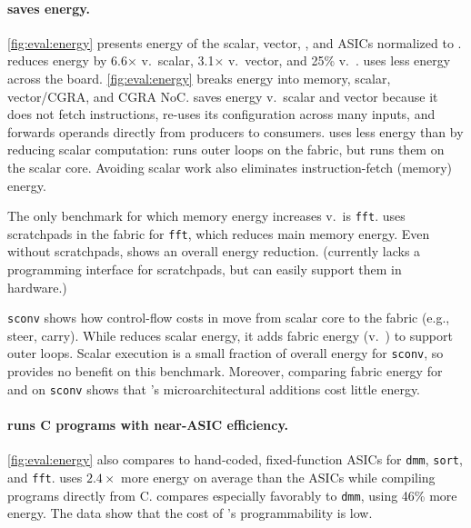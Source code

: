 \paragraph{\riptide saves energy.}
\autoref{fig:eval:energy} presents energy of the scalar, vector, 
\snafu, and ASICs normalized to \riptide.
% 
\riptide reduces energy by 6.6$\times$ v.\ scalar, 3.1$\times$ v.\ vector, and 25\% v.\ \snafu.
%
\riptide uses less energy across the board.
% 
\autoref{fig:eval:energy} breaks energy into memory, scalar, vector/CGRA, and CGRA NoC.
% 
\riptide saves energy v.\ scalar and vector because it does not fetch instructions,
re-uses its configuration across many inputs, and forwards operands 
directly from producers to consumers.
% 
\riptide uses less energy than \snafu by reducing scalar computation:  \riptide runs
outer loops on the fabric, but \snafu runs them on the scalar core.
% 
Avoiding scalar work also eliminates instruction-fetch (memory) energy. 

The only benchmark for which memory energy increases v.\ \snafu is {\tt fft}.
% 
\snafu uses scratchpads in the fabric for {\tt fft}, which reduces main memory energy.
% 
Even without scratchpads, \riptide shows an overall energy reduction.
(\riptide currently lacks a programming interface for scratchpads,
but can easily support them in hardware.)

{\tt sconv} shows how control-flow costs in \riptide move from scalar core to the
fabric (e.g., steer, carry).
% 
While \riptide reduces scalar energy, it adds fabric energy (v.\
\snafu) to support outer loops.
% 
Scalar execution is a small fraction of overall energy for {\tt sconv},
so \riptide provides no benefit on this benchmark.
%
Moreover, comparing fabric energy for \snafu and \riptide on {\tt sconv} shows that
\riptide's microarchitectural additions cost little energy.
% 

\paragraph{\riptide runs C programs with near-ASIC efficiency.}
\autoref{fig:eval:energy} also compares \riptide to hand-coded, fixed-function
ASICs for {\tt dmm}, {\tt sort}, and {\tt fft}.
% 
\riptide uses $2.4\times$ more energy on average
than the ASICs while
compiling programs directly from C. %
% 
\riptide compares especially favorably to {\tt dmm}, using 46\% more energy.
% 
The data show that the cost of \riptide's programmability is low.

